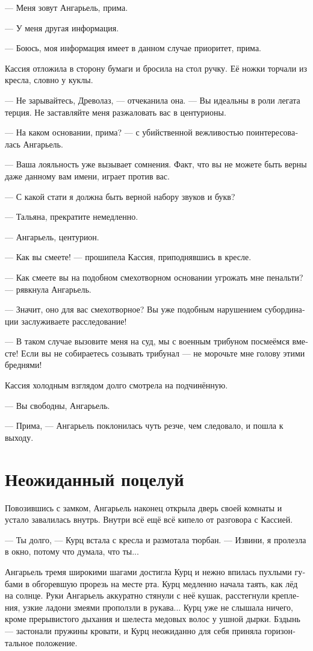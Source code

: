 \documentclass[a4paper,12pt,fleqn]{book}\usepackage{cooltooltips}\usepackage{polyglossia}\setdefaultlanguage[babelshorthands=true]{russian}\setotherlanguage{english}\defaultfontfeatures{Ligatures=TeX,Mapping=tex-text} \usepackage{xcolor}\definecolor{lightgray}{HTML}{bbbbbb}\color{lightgray}\newcommand{\ml}[3]{\textenglish{\textcolor{black}{#3}}}
\begin{document}
--- Меня зовут Ангарьель, прима.

--- У меня другая информация.

--- Боюсь, моя информация имеет в данном случае приоритет, прима.

Кассия отложила в сторону бумаги и бросила на стол ручку.
Её ножки торчали из кресла, словно у куклы.

--- Не зарывайтесь, Древолаз, --- отчеканила она.
--- Вы идеальны в роли легата терция.
Не заставляйте меня разжаловать вас в центурионы.

--- На каком основании, прима? --- с убийственной вежливостью поинтересовалась Ангарьель.

--- Ваша лояльность уже вызывает сомнения.
Факт, что вы не можете быть верны даже данному вам имени, играет против вас.

--- С какой стати я должна быть верной набору звуков и букв?

--- Тальяна, прекратите немедленно.

--- Ангарьель, центурион.

--- Как вы смеете! --- прошипела Кассия, приподнявшись в кресле.

--- Как смеете вы на подобном смехотворном основании угрожать мне пенальти? --- рявкнула Ангарьель.

--- Значит, оно для вас смехотворное?
Вы уже подобным нарушением субординации заслуживаете расследование!

--- В таком случае вызовите меня на суд, мы с военным трибуном посмеёмся вместе!
Если вы не собираетесь созывать трибунал --- не морочьте мне голову этими бреднями!

Кассия холодным взглядом долго смотрела на подчинённую.

--- Вы свободны, Ангарьель.

--- Прима, --- Ангарьель поклонилась чуть резче, чем следовало, и пошла к выходу.

\section{Неожиданный поцелуй}

Повозившись с замком, Ангарьель наконец открыла дверь своей комнаты и устало завалилась внутрь.
Внутри всё ещё всё кипело от разговора с Кассией.

--- Ты долго, --- Курц встала с кресла и размотала тюрбан.
--- Извини, я пролезла в окно, потому что думала, что ты...

Ангарьель тремя широкими шагами достигла Курц и нежно впилась пухлыми губами в обгоревшую прорезь на месте рта.
Курц медленно начала таять, как лёд на солнце.
Руки Ангарьель аккуратно стянули с неё кушак, расстегнули крепления, узкие ладони змеями проползли в рукава...
Курц уже не слышала ничего, кроме прерывистого дыхания и шелеста медовых волос у ушной дырки.
Бздынь --- застонали пружины кровати, и Курц неожиданно для себя приняла горизонтальное положение.
\end{document}
